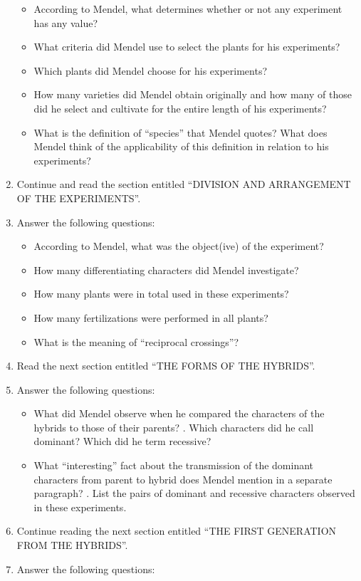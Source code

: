 \documentclass[]{book}
\providecommand{\tightlist}{%
  \setlength{\itemsep}{0pt}\setlength{\parskip}{0pt}}
\theoremstyle{definition}
\theoremstyle{definition}
\theoremstyle{definition}
\theoremstyle{remark}
\begin{document}
\begin{enumerate}
  \begin{itemize}
  \tightlist
  \item
    According to Mendel, what determines whether or not any experiment
    has any value?
  \item
    What criteria did Mendel use to select the plants for his
    experiments?
  \item
    Which plants did Mendel choose for his experiments?
  \item
    How many varieties did Mendel obtain originally and how many of
    those did he select and cultivate for the entire length of his
    experiments?
  \item
    What is the definition of ``species'' that Mendel quotes? What does
    Mendel think of the applicability of this definition in relation to
    his experiments?
  \end{itemize}
\item
  Continue and read the section entitled ``DIVISION AND ARRANGEMENT OF
  THE EXPERIMENTS''.
\item
  Answer the following questions:

  \begin{itemize}
  \tightlist
  \item
    According to Mendel, what was the object(ive) of the experiment?
  \item
    How many differentiating characters did Mendel investigate?
  \item
    How many plants were in total used in these experiments?
  \item
    How many fertilizations were performed in all plants?
  \item
    What is the meaning of ``reciprocal crossings''?
  \end{itemize}
\item
  Read the next section entitled ``THE FORMS OF THE HYBRIDS''.
\item
  Answer the following questions:

  \begin{itemize}
  \tightlist
  \item
    What did Mendel observe when he compared the characters of the
    hybrids to those of their parents? . Which characters did he call
    dominant? Which did he term recessive?
  \item
    What ``interesting'' fact about the transmission of the dominant
    characters from parent to hybrid does Mendel mention in a separate
    paragraph? . List the pairs of dominant and recessive characters
    observed in these experiments.
  \end{itemize}
\item
  Continue reading the next section entitled ``THE FIRST GENERATION FROM
  THE HYBRIDS''.
\item
  Answer the following questions:


\end{enumerate}
\end{document}
